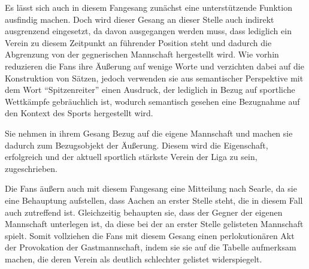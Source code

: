 Es lässt sich auch in diesem Fangesang zunächst eine unterstützende Funktion ausfindig machen.
Doch wird dieser Gesang an dieser Stelle auch indirekt ausgrenzend eingesetzt, da davon ausgegangen werden muss, dass lediglich ein Verein zu diesem Zeitpunkt an führender Position steht und dadurch die Abgrenzung von der gegnerischen Mannschaft hergestellt wird.
Wie vorhin reduzieren die Fans ihre Äußerung auf wenige Worte und verzichten dabei auf die Konstruktion von Sätzen, jedoch verwenden sie aus semantischer Perspektive mit dem Wort "`Spitzenreiter"' einen Ausdruck, der lediglich in Bezug auf sportliche Wettkämpfe gebräuchlich ist, wodurch semantisch gesehen eine Bezugnahme auf den Kontext des Sports hergestellt wird.

Sie nehmen in ihrem Gesang Bezug auf die eigene Mannschaft und machen sie dadurch zum Bezugsobjekt der Äußerung.
Diesem wird die Eigenschaft, erfolgreich und der aktuell sportlich stärkste Verein der Liga zu sein, zugeschrieben.

Die Fans äußern auch mit diesem Fangesang eine Mitteilung nach Searle, da sie eine Behauptung aufstellen, dass Aachen an erster Stelle steht, die in diesem Fall auch zutreffend ist.
Gleichzeitig behaupten sie, dass der Gegner der eigenen Mannschaft unterlegen ist, da diese bei der an erster Stelle gelisteten Mannschaft spielt.
Somit vollziehen die Fans mit diesem Gesang einen perlokutionären Akt der Provokation der Gastmannschaft, indem sie sie auf die Tabelle aufmerksam machen, die deren Verein als deutlich schlechter gelistet widerspiegelt.


